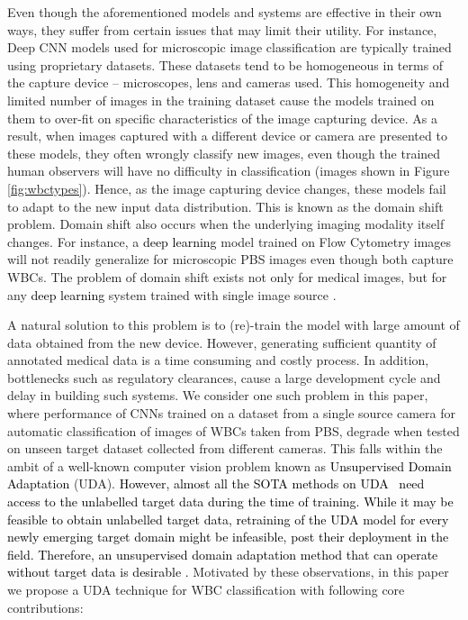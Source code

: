 \documentclass[journal,twoside,web]{IEEEtran}
\newcommand{\cc}{\textcolor{black}}
\newcommand{\bb}{\textcolor{black}}
\begin{document}
Even though the aforementioned models and systems are effective in their own ways, they suffer from certain issues that may limit their utility. For instance, Deep CNN models used for microscopic image classification are typically trained using proprietary datasets. These datasets tend to be homogeneous in terms of the capture device -- microscopes, lens and cameras used. This homogeneity and limited number of images in the training dataset cause the models trained on them to over-fit on specific characteristics of the image capturing device. As a result, when images captured with a different device or camera are presented to these models, they often wrongly classify new images, even though the trained human observers will have no difficulty in classification (images shown in Figure \ref{fig:wbctypes}). Hence, as the image capturing device changes, these models fail to adapt to the new input data distribution. This is known as the domain shift problem. Domain shift also occurs when the underlying imaging modality itself changes. For instance, a \cc{deep learning} model trained on Flow Cytometry images \cite{lippeveld2019classification} will not readily generalize for microscopic PBS images even though both capture WBCs. The problem of domain shift exists not only for medical images, but for any \cc{deep learning} system trained with single image source \cite{tzeng2017adversarial}.
\par A natural solution to this problem is to (re)-train the model with large amount of data obtained from the new device. However, generating sufficient quantity of annotated medical data is a time consuming and costly process. In addition, bottlenecks such as regulatory clearances, cause a large development cycle and delay in building such systems. We consider one such problem in this paper, where performance of CNNs trained on a dataset from a single source camera for automatic classification of images of WBCs taken from PBS, degrade when tested on unseen target dataset collected from different cameras. This falls within the ambit of a well-known computer vision problem known as \cc{Unsupervised Domain Adaptation} (UDA). \bb{However, almost all the SOTA methods on UDA~\cite{tzeng2017adversarial, ganin2017domain, sankaranarayanan2018generate} need access to the unlabelled target data during the time of training. While it may be feasible to obtain unlabelled target data, retraining of the UDA model for every newly emerging target domain might be infeasible, post their deployment in the field. Therefore, an unsupervised domain adaptation method that can operate without target data is desirable \cite{pandey2020skin}.} Motivated by these observations, in this paper we propose a UDA technique for WBC classification with following core contributions:
\end{document}
